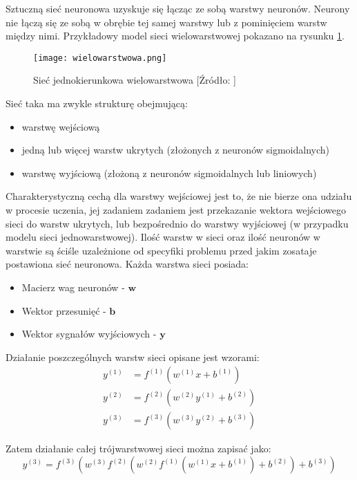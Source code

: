 \documentclass[12pt,twoside]{article}
\begin{document}
Sztuczną sieć neuronowa uzyskuje się łącząc ze sobą warstwy neuronów. Neurony nie łączą się ze sobą w obrębie tej samej warstwy lub z pominięciem warstw między nimi. Przykładowy model sieci wielowarstwowej pokazano na rysunku \ref{wielo}.

\begin{figure}[h]
\label{wielo}
\centering
\texttt{[image: wielowarstwowa.png]}
\caption{Sieć jednokierunkowa wielowarstwowa	[Źródło: \cite{zajdel1}]}
\end{figure}

Sieć taka ma zwykle strukturę obejmującą: 
\begin{itemize}
\item warstwę wejściową
\item jedną lub więcej warstw ukrytych (złożonych z neuronów sigmoidalnych)
\item warstwę wyjściową (złożoną z neuronów sigmoidalnych lub liniowych)
\end{itemize}

Charakterystyczną cechą dla warstwy wejściowej jest to, że nie bierze ona udziału w procesie uczenia, jej zadaniem zadaniem jest przekazanie wektora wejściowego sieci do warstw ukrytych, lub bezpośrednio do warstwy wyjściowej (w przypadku modelu sieci jednowarstwowej). Ilość warstw w sieci oraz ilość neuronów w warstwie są ściśle uzależnione od specyfiki problemu przed jakim zosataje postawiona sieć neuronowa.
\newpage
Każda warstwa sieci posiada:
\begin{itemize}
\item Macierz wag neuronów - $\textbf{w}$
\item Wektor przesunięć - $\textbf{b}$
\item Wektor sygnałów wyjściowych - $\textbf{y}$
\end{itemize}

Działanie poszczególnych warstw sieci opisane jest wzorami:
\begin{equation}\label{warstwy}
\begin{aligned}
y^{(1)} &= f^{(1)}(w^{(1)}x + b^{(1)})\\
y^{(2)} &= f^{(2)}(w^{(2)}y^{(1)} + b^{(2)})\\
y^{(3)} &= f^{(3)}(w^{(3)}y^{(2)} + b^{(3)})
\end{aligned}
\end{equation}

Zatem działanie całej trójwarstwowej sieci można zapisać jako:
\begin{equation}
y^{(3)} = f^{(3)}\left( w^{(3)} f^{(2)} \left( w^{(2)}f^{(1)} \left( w^{(1)}x + b^{(1)}\right) + b^{(2)} \right) + b^{(3)} \right)
\end{equation}
\\
\end{document}
